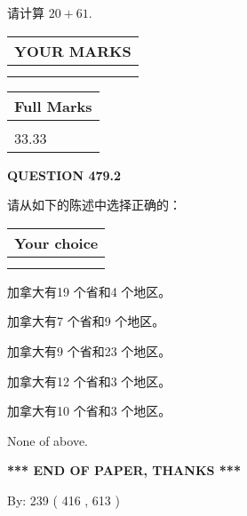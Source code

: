 \documentclass{ctexart}
\begin{document}
  
 
请计算 $ %
20 +  %
61 $.
 

 

 
  
\vspace{0.2in}
  
\noindent\begin{tabular}{|l|}
\hline
 YOUR MARKS  \\
\hline
 \\ 
 \\ 
\hline
\end{tabular}
\hspace{0.05in} \begin{tabular}{|l|}
\hline
 Full Marks  \\
\hline
 \\ 
33.33 \\
\hline
\end{tabular}
{\textbf{\Large{QUESTION
479.2 
}}}
  
  
请从如下的陈述中选择正确的：
  
  
\noindent\hspace{3.0in} \begin{tabular}{|l|}
\hline
Your choice \\
\hline
 \\ 
 \\ 
\hline
\end{tabular}
  
  
 
 
加拿大有19 个省和4 个地区。
 
 
加拿大有7 个省和9 个地区。
 
 
加拿大有9 个省和23 个地区。
 
 
加拿大有12 个省和3 个地区。
 
 
加拿大有10 个省和3 个地区。
 
 
 None of above.
 
 
   
   
 \vspace{0.2in}
 
   
   
   
   
\vspace{1.0in} 
{\textbf{\large{ *** END OF PAPER, THANKS *** }}} 
   
   
\hspace{1.0in} By: 
 239 ( 416 ,  613 )
   
\end{document}
